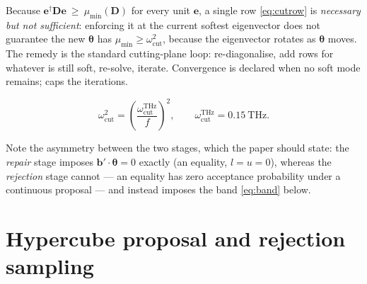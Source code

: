 \documentclass[11pt,a4paper]{article}
\newcommand{\jl}[1]{\path{#1}}
\begin{document}
Because $\bm e^{\dagger}\bm D\bm e\ \ge\ \mu_{\min}(\bm D)$ for every unit $\bm e$, a
single row \eqref{eq:cutrow} is \emph{necessary but not sufficient}: enforcing it at the
current softest eigenvector does not guarantee the new $\bm\theta$ has
$\mu_{\min}\ge\omega_{\mathrm{cut}}^{2}$, because the eigenvector rotates as
$\bm\theta$ moves. The remedy is the standard cutting-plane loop: re-diagonalise, add
rows for whatever is still soft, re-solve, iterate. Convergence is declared when no soft
mode remains; \jl{max_cuts = 40} caps the iterations.

\begin{equation}
\omega^{2}_{\mathrm{cut}} = \left(\frac{\omega^{\mathrm{THz}}_{\mathrm{cut}}}{f}\right)^{2},
\qquad \omega^{\mathrm{THz}}_{\mathrm{cut}} = 0.15\ \mathrm{THz}.
\end{equation}

Note the asymmetry between the two stages, which the paper should state: the
\emph{repair} stage imposes $\bm b'\cdot\bm\theta=0$ exactly (an equality,
$l=u=0$), whereas the \emph{rejection} stage cannot --- an equality has zero acceptance
probability under a continuous proposal --- and instead imposes the band
\eqref{eq:band} below.

\section{Hypercube proposal and rejection sampling}
\label{sec:sampling}
\end{document}

